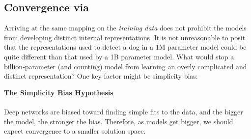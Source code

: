 \documentclass{article}
\newcommand{\jh}[1]{{\;\color{red}JH: #1}}
\newcommand{\hypbox}[2]{%
\begin{tcolorbox}[colback=white!98!black,colframe=white!30!black,boxsep=1.1pt,top=6.75pt]%
\vspace{1.75pt}%
\textbf{#1}\\[-0.575em]
\noindent\makebox[\textwidth]{\rule{\textwidth}{0.4pt}}
\\[0.25em]
#2
\end{tcolorbox}
}
\theoremstyle{plain}
\theoremstyle{definition}
\theoremstyle{remark}
\begin{document}




\subsection{Convergence via }\label{sec:simplicity_bias_hypothesis}


Arriving at the same mapping on the \textit{training data} does not prohibit the models from developing distinct internal representations. It is not unreasonable to posit that the representations used to detect a dog in a 1M parameter model could be quite different than that used by a 1B parameter model. What would stop a billion-parameter (and counting) model from learning an overly complicated and distinct representation? One key factor might be simplicity bias:

\hypbox{The Simplicity Bias Hypothesis}{
Deep networks are biased toward finding simple fits to the data, and the bigger the model, the stronger the bias. Therefore, as models get bigger, we should expect convergence to a smaller solution space.}


\end{document}
